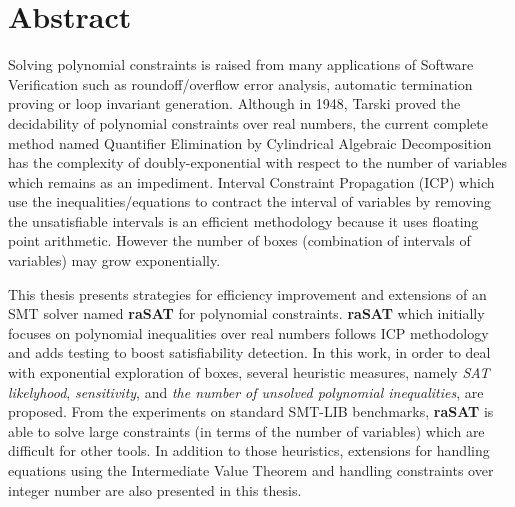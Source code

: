 \chapter*{\centering Abstract} 
Solving polynomial constraints is raised from many applications of Software Verification such as roundoff/overflow error analysis, automatic termination proving or loop invariant generation. Although in 1948, Tarski proved the decidability of polynomial constraints over real numbers, the current complete method named Quantifier Elimination by Cylindrical Algebraic Decomposition has the complexity of doubly-exponential with respect to the number of variables which remains as an impediment. Interval Constraint Propagation (ICP) which use the inequalities/equations to contract the interval of variables by removing the unsatisfiable intervals is an efficient methodology because it uses floating point arithmetic. However the number of boxes (combination of intervals of variables) may grow exponentially.

This thesis presents strategies for efficiency improvement and extensions of an SMT solver named {\bf raSAT} for polynomial constraints. {\bf raSAT} which initially focuses on polynomial inequalities over real numbers follows ICP methodology and adds testing to boost satisfiability detection. In this work, in order to deal with exponential exploration of boxes, several heuristic measures, namely {\em SAT likelyhood}, {\em sensitivity}, and \emph{the number of 
unsolved polynomial inequalities}, are proposed. From the experiments on standard SMT-LIB benchmarks, \textbf{raSAT} is able to solve large constraints (in terms of the number of variables) which are difficult for other tools. 
In addition to those heuristics, extensions for handling equations using the Intermediate Value Theorem and handling constraints over integer number are also presented in this thesis.